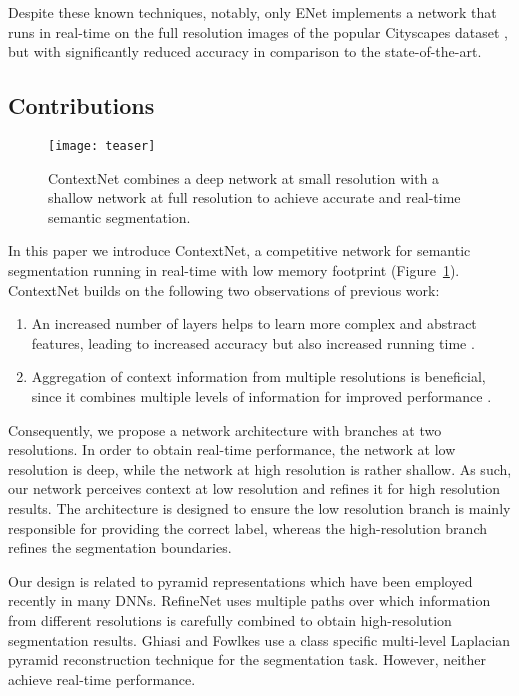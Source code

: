 \documentclass[runningheads]{llncs}
\begin{document}
Despite these known techniques, notably, only ENet \cite{paszke2016} implements a network that runs in real-time on the full resolution images of the popular Cityscapes dataset \cite{cityscaples2016}, but with significantly reduced accuracy in comparison to the state-of-the-art.

\subsection{Contributions}
\begin{figure}[t]
\centering
\texttt{[image: teaser]}
\caption{ContextNet combines a deep network at small resolution with a shallow network at full resolution to achieve accurate and real-time semantic segmentation.}\label{fig:teaser}
\end{figure}
In this paper we introduce ContextNet, a competitive network for semantic segmentation running in real-time with low memory footprint (Figure~\ref{fig:teaser}). ContextNet builds on the following two observations of previous work:
\begin{enumerate}
  \item{An increased number of layers helps to learn more complex and abstract features, leading to increased accuracy but also increased running time \cite{he2015,chen2016,zhao2017a}.}
  \item{Aggregation of context information from multiple resolutions is beneficial, since it combines multiple levels of information for improved performance \cite{long2016,zhao2017a}.}
\end{enumerate}
Consequently, we propose a network architecture with branches at two resolutions. In order to obtain real-time performance, the network at low resolution is deep, while the network at high resolution is rather shallow. As such, our network perceives context at low resolution and refines it for high resolution results. The architecture is designed to ensure the low resolution branch is mainly responsible for providing the correct label, whereas the high-resolution branch refines the segmentation boundaries.

Our design is related to pyramid representations \cite{burt1987} which have been employed recently in many DNNs. RefineNet \cite{lin2017} uses multiple paths over which information from different resolutions is carefully combined to obtain high-resolution segmentation results. Ghiasi and Fowlkes \cite{ghiasi2016} use a class specific multi-level Laplacian pyramid reconstruction technique for the segmentation task. However, neither achieve real-time performance.
\end{document}
